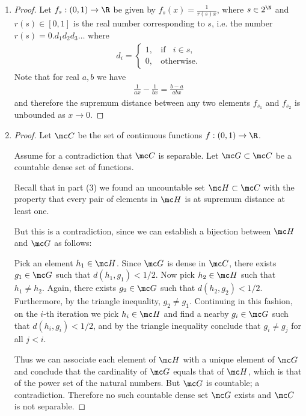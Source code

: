 \begin{enumerate}[label=(2.\arabic*)]
\item
  \begin{proof}
    Let $f_s: (0, 1) \to \R$ be given by $f_s(x) = \frac{1}{r(s)x}$, where $s \in 2^\N$ and $r(s) \in [0, 1]$ is
    the real number corresponding to $s$, i.e. the number $r(s) = 0.d_1d_2d_3\ldots$ where
    \begin{align*}
      d_i =
      \begin{cases}
        1, ~~~~ \text{if} ~~~~ i \in s,\\
        0, ~~~~ \text{otherwise}.
      \end{cases}
    \end{align*}
    Note that for real $a, b$ we have
    \begin{align*}
      \frac{1}{ax} - \frac{1}{bx} = \frac{b - a}{abx}
    \end{align*}
    and therefore the supremum distance between any two elements $f_{s_1}$ and $f_{s_2}$ is unbounded
    as $x \to 0$.
  \end{proof}
\item
  \begin{proof}
    Let $\mc C$ be the set of continuous functions $f: (0, 1) \to \R$.

    Assume for a contradiction that $\mc C$ is separable. Let $\mc G \subset \mc C$ be a countable dense set of
    functions.

    Recall that in part (3) we found an uncountable set $\mc H \subset \mc C$ with the property that every pair
    of elements in $\mc H$ is at supremum distance at least one.

    But this is a contradiction, since we can establish a bijection between $\mc H$ and $\mc G$ as follows:

    Pick an element $h_1 \in \mc H$. Since $\mc G$ is dense in $\mc C$, there exists $g_1 \in \mc G$ such
    that $d(h_1, g_1) < 1/2$. Now pick $h_2 \in \mc H$ such that $h_1 \neq h_2$. Again, there
    exists $g_2 \in \mc G$ such that $d(h_2, g_2) < 1/2$. Furthermore, by the triangle
    inequality, $g_2 \neq g_1$. Continuing in this fashion, on the $i$-th iteration we pick $h_i \in \mc H$ and
    find a nearby $g_i \in \mc G$ such that $d(h_i, g_i) < 1/2$, and by the triangle inequality conclude
    that $g_i \neq g_j$ for all $j < i$.

    Thus we can associate each element of $\mc H$ with a unique element of $\mc G$ and conclude that the
    cardinality of $\mc G$ equals that of $\mc H$, which is that of the power set of the natural numbers.
    But $\mc G$ is countable; a contradiction. Therefore no such countable dense set $\mc G$ exists and $\mc C$
    is not separable.
  \end{proof}
\end{enumerate}


